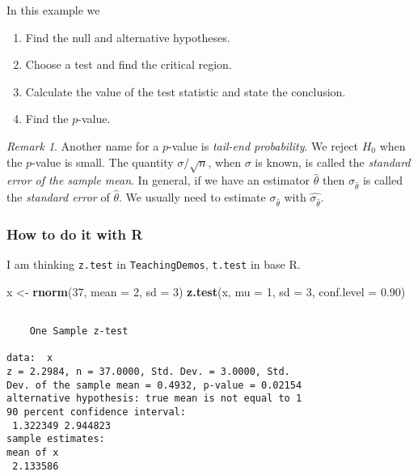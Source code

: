 \documentclass[]{book}
\newenvironment{Shaded}{\begin{snugshade}}{\end{snugshade}}
\newcommand{\KeywordTok}[1]{\textcolor[rgb]{0.13,0.29,0.53}{\textbf{{#1}}}}
\newcommand{\DataTypeTok}[1]{\textcolor[rgb]{0.13,0.29,0.53}{{#1}}}
\newcommand{\DecValTok}[1]{\textcolor[rgb]{0.00,0.00,0.81}{{#1}}}
\newcommand{\FloatTok}[1]{\textcolor[rgb]{0.00,0.00,0.81}{{#1}}}
\newcommand{\StringTok}[1]{\textcolor[rgb]{0.31,0.60,0.02}{{#1}}}
\newcommand{\NormalTok}[1]{{#1}}
\providecommand{\tightlist}{%
  \setlength{\itemsep}{0pt}\setlength{\parskip}{0pt}}
\numberwithin{equation}{chapter}
\numberwithin{figure}{chapter}
\theoremstyle{plain}
\theoremstyle{definition}
\theoremstyle{remark}
\theoremstyle{definition}
\theoremstyle{definition}
\theoremstyle{remark}
\newtheorem*{remark}{Remark}
\let\BeginKnitrBlock\begin \let\EndKnitrBlock\end
\begin{document}
\bigskip

\BeginKnitrBlock{example}
\protect\hypertarget{ex:unnamed-chunk-431}{}{\label{ex:unnamed-chunk-431}}In
this example we

\begin{enumerate}
\def\labelenumi{\arabic{enumi}.}
\tightlist
\item
  Find the null and alternative hypotheses.
\item
  Choose a test and find the critical region.
\item
  Calculate the value of the test statistic and state the conclusion.
\item
  Find the \(p\)-value.
\end{enumerate}
\EndKnitrBlock{example}

\begin{remark}
Another name for a \(p\)-value is \emph{tail-end probability}. We reject
\(H_{0}\) when the \(p\)-value is small. The quantity
\(\sigma/\sqrt{n}\), when \(\sigma\) is known, is called the
\emph{standard error of the sample mean}. In general, if we have an
estimator \(\hat{\theta}\) then \(\sigma_{\hat{\theta}}\) is called the
\emph{standard error} of \(\hat{\theta}\). We usually need to estimate
\(\sigma_{\hat{\theta}}\) with \(\hat{\sigma_{\hat{\theta}}}\).
\end{remark}

\subsubsection{How to do it with R}\label{how-to-do-it-with-r-41}

I am thinking \texttt{z.test}  in
\texttt{TeachingDemos}, \texttt{t.test} 
in base R.

\begin{Shaded}
\begin{Highlighting}[]
\NormalTok{x <-}\StringTok{ }\KeywordTok{rnorm}\NormalTok{(}\DecValTok{37}\NormalTok{, }\DataTypeTok{mean =} \DecValTok{2}\NormalTok{, }\DataTypeTok{sd =} \DecValTok{3}\NormalTok{)}
\KeywordTok{z.test}\NormalTok{(x, }\DataTypeTok{mu =} \DecValTok{1}\NormalTok{, }\DataTypeTok{sd =} \DecValTok{3}\NormalTok{, }\DataTypeTok{conf.level =} \FloatTok{0.90}\NormalTok{)}
\end{Highlighting}
\end{Shaded}

\begin{verbatim}

    One Sample z-test

data:  x
z = 2.2984, n = 37.0000, Std. Dev. = 3.0000, Std.
Dev. of the sample mean = 0.4932, p-value = 0.02154
alternative hypothesis: true mean is not equal to 1
90 percent confidence interval:
 1.322349 2.944823
sample estimates:
mean of x 
 2.133586 
\end{verbatim}
\end{document}
